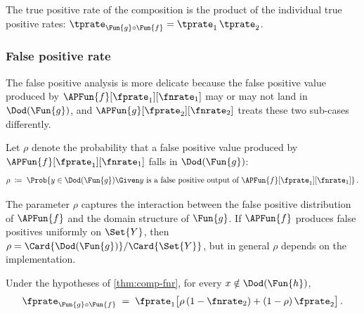 \documentclass[ ../main.tex]{subfiles}
\begin{document}
\begin{remark}
The true positive rate of the
composition is the product of the individual true positive rates:
$\tprate_{\Fun{g} \circ \Fun{f}} = \tprate_1 \, \tprate_2$.
\end{remark}

\subsubsection{False positive rate}
The false positive analysis is more delicate because the false positive
value produced by $\APFun{f}[\fprate_1][\fnrate_1]$ may or may not
land in $\Dod(\Fun{g})$, and $\APFun{g}[\fprate_2][\fnrate_2]$ treats
these two sub-cases differently.

\begin{definition}
\label{def:rho}
Let $\rho$ denote the probability that a false positive value
produced by $\APFun{f}[\fprate_1][\fnrate_1]$ falls in
$\Dod(\Fun{g})$:
\begin{equation}
\label{eq:rho-def}
\rho
\;\coloneqq\;
\Prob{y \in \Dod(\Fun{g}) \Given
      y \text{ is a false positive output of }
      \APFun{f}[\fprate_1][\fnrate_1]}\,.
\end{equation}
\end{definition}

The parameter $\rho$ captures the
interaction between the false positive distribution of $\APFun{f}$ and
the domain structure of $\Fun{g}$.
If $\APFun{f}$ produces false positives uniformly on $\Set{Y}$, then
$\rho = \Card{\Dod(\Fun{g})}/\Card{\Set{Y}}$, but in general $\rho$
depends on the implementation.

\begin{theorem}
\label{thm:comp-fpr}
Under the hypotheses of \cref{thm:comp-fnr}, for every
$x \notin \Dod(\Fun{h})$,
\begin{equation}
\label{eq:comp-fpr}
\fprate_{\Fun{g} \circ \Fun{f}}
\;=\;
\fprate_1
\bigl[\rho\,(1-\fnrate_2) + (1-\rho)\,\fprate_2\bigr]\,.
\end{equation}
\end{theorem}
\end{document}
